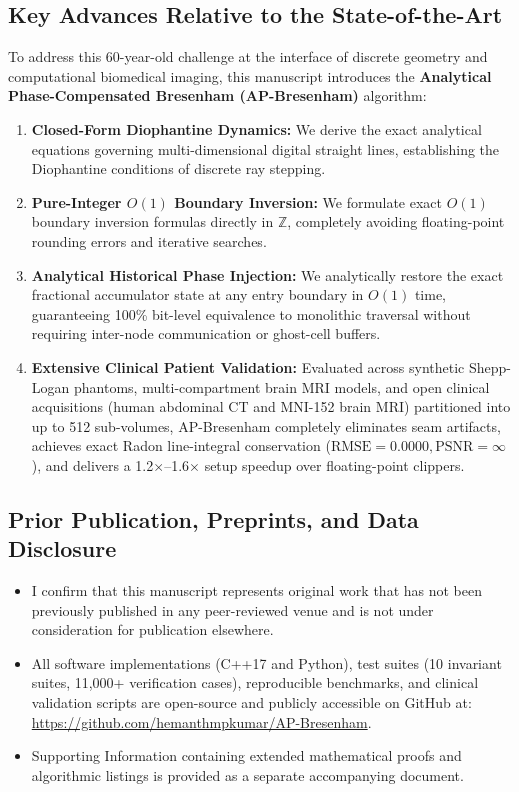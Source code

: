\documentclass[11pt]{article}
\begin{document}
\subsection*{Key Advances Relative to the State-of-the-Art}
To address this 60-year-old challenge at the interface of discrete geometry and computational biomedical imaging, this manuscript introduces the \textbf{Analytical Phase-Compensated Bresenham (AP-Bresenham)} algorithm:
\begin{enumerate}
    \item \textbf{Closed-Form Diophantine Dynamics:} We derive the exact analytical equations governing multi-dimensional digital straight lines, establishing the Diophantine conditions of discrete ray stepping.
    \item \textbf{Pure-Integer $O(1)$ Boundary Inversion:} We formulate exact $O(1)$ boundary inversion formulas directly in $\mathbb{Z}$, completely avoiding floating-point rounding errors and iterative searches.
    \item \textbf{Analytical Historical Phase Injection:} We analytically restore the exact fractional accumulator state at any entry boundary in $O(1)$ time, guaranteeing 100\% bit-level equivalence to monolithic traversal without requiring inter-node communication or ghost-cell buffers.
    \item \textbf{Extensive Clinical Patient Validation:} Evaluated across synthetic Shepp-Logan phantoms, multi-compartment brain MRI models, and open clinical acquisitions (human abdominal CT and MNI-152 brain MRI) partitioned into up to 512 sub-volumes, AP-Bresenham completely eliminates seam artifacts, achieves exact Radon line-integral conservation ($\mathrm{RMSE} = 0.0000, \mathrm{PSNR} = \infty$), and delivers a 1.2$\times$--1.6$\times$ setup speedup over floating-point clippers.
\end{enumerate}

\subsection*{Prior Publication, Preprints, and Data Disclosure}
\begin{itemize}
    \item I confirm that this manuscript represents original work that has not been previously published in any peer-reviewed venue and is not under consideration for publication elsewhere.
    \item All software implementations (C++17 and Python), test suites (10 invariant suites, 11,000+ verification cases), reproducible benchmarks, and clinical validation scripts are open-source and publicly accessible on GitHub at: \url{https://github.com/hemanthmpkumar/AP-Bresenham}.
    \item Supporting Information containing extended mathematical proofs and algorithmic listings is provided as a separate accompanying document.
\end{itemize}
\end{document}
